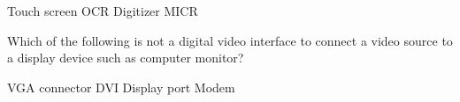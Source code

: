 \documentclass[a4paper]{exam}
\begin{document}
\begin{questions}
\begin{oneparchoices}
    \choice Touch screen
    \choice OCR
    \choice Digitizer
    \choice MICR
\end{oneparchoices}

\question Which of the following is not a digital video interface to connect a video source to a display device such as computer monitor?

\begin{oneparchoices}
    \choice VGA connector
    \choice DVI
    \choice Display port
    \choice Modem
\end{oneparchoices}



\end{questions}
\end{document}
